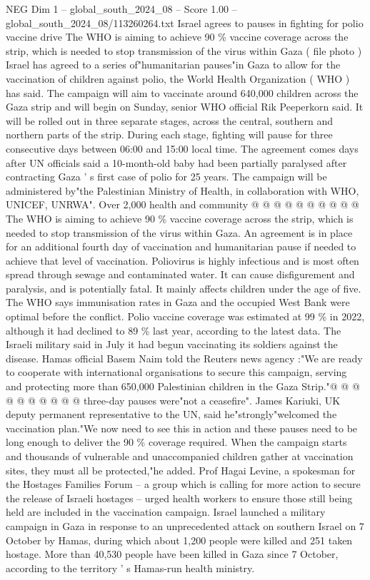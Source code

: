 \begin{textsample}{NEG Dim 1 – global\_south\_2024\_08 – Score 1.00 – global\_south\_2024\_08/113260264.txt}  \label{ex:f1_neg_437}
Israel agrees to pauses in fighting for polio vaccine drive The WHO is aiming to achieve 90 \% vaccine coverage across the strip, which is needed to stop transmission of the virus within Gaza ( file photo ) Israel has agreed to a series of"humanitarian pauses"in Gaza to allow for the vaccination of children against polio, the World Health Organization ( WHO ) has said.
The campaign will aim to vaccinate around 640,000 children across the Gaza strip and will begin on Sunday, senior WHO official Rik Peeperkorn said.
It will be rolled out in three separate stages, across the central, southern and northern parts of the strip.
During each stage, fighting will pause for three consecutive days between 06:00 and 15:00 local time.
The agreement comes days after UN officials said a 10-month-old baby had been partially paralysed after contracting Gaza ' s first case of polio for 25 years.
The campaign will be administered by"the Palestinian Ministry of Health, in collaboration with WHO, UNICEF, UNRWA".
Over 2,000 health and community @ @ @ @ @ @ @ @ @ @ The WHO is aiming to achieve 90 \% vaccine coverage across the strip, which is needed to stop transmission of the virus within Gaza.
An agreement is in place for an additional fourth day of vaccination and humanitarian pause if needed to achieve that level of vaccination.
Poliovirus is highly infectious and is most often spread through sewage and contaminated water.
It can cause disfigurement and paralysis, and is potentially fatal.
It mainly affects children under the age of five.
The WHO says immunisation rates in Gaza and the occupied West Bank were optimal before the conflict.
Polio vaccine coverage was estimated at 99 \% in 2022, although it had declined to 89 \% last year, according to the latest data.
The Israeli military said in July it had begun vaccinating its soldiers against the disease.
Hamas official Basem Naim told the Reuters news agency :"We are ready to cooperate with international organisations to secure this campaign, serving and protecting more than 650,000 Palestinian children in the Gaza Strip."@ @ @ @ @ @ @ @ @ @ three-day pauses were"not a ceasefire".
James Kariuki, UK deputy permanent representative to the UN, said he"strongly"welcomed the vaccination plan."We now need to see this in action and these pauses need to be long enough to deliver the 90 \% coverage required.
When the campaign starts and thousands of vulnerable and unaccompanied children gather at vaccination sites, they must all be protected,"he added.
Prof Hagai Levine, a spokesman for the Hostages Families Forum -- a group which is calling for more action to secure the release of Israeli hostages -- urged health workers to ensure those still being held are included in the vaccination campaign.
Israel launched a military campaign in Gaza in response to an unprecedented attack on southern Israel on 7 October by Hamas, during which about 1,200 people were killed and 251 taken hostage.
More than 40,530 people have been killed in Gaza since 7 October, according to the territory ' s Hamas-run health ministry.

\end{textsample}
